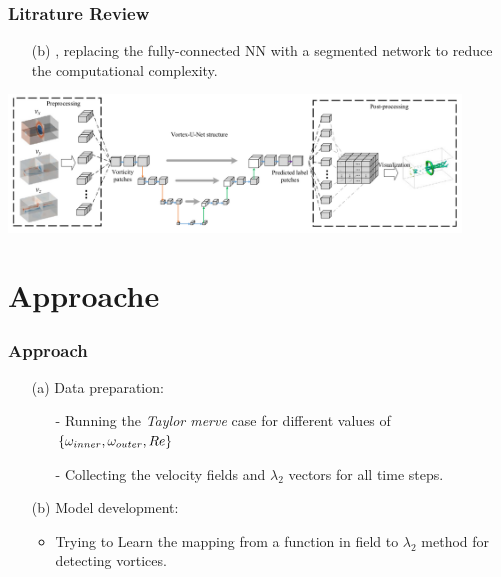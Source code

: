 \documentclass[aspectratio=169]{beamer}
\begin{document}
\begin{frame}
  \frametitle{Litrature Review}
  \begin{itemize}
    \item[(b)] \cite{DENG2022108229}, replacing the fully-connected NN with a segmented network to reduce the computational complexity.
  \end{itemize}
  \begin{center}
    \includegraphics[width=0.9\textwidth]{U-net.png}
  \end{center}
\end{frame}

\section{Approache}
\begin{frame}
  \frametitle{Approach}
  \begin{itemize}
    \item[(a)] Data preparation:
    \begin{itemize}
      \item[-] Running the  \textit{Taylor merve} case for different values of  $\{\omega_{inner}, \omega_{outer}, \mathnormal{Re}\}$
      \item[-] Collecting the velocity fields and $\lambda_2$ vectors for all time steps.
    \end{itemize}
    \item [(b)] Model development:
      \begin{itemize}
        \item Trying to Learn the mapping from a function in field to $\lambda_{2}$ method for detecting vortices.
      \end{itemize}
  \end{itemize}
\end{frame}
\end{document}
